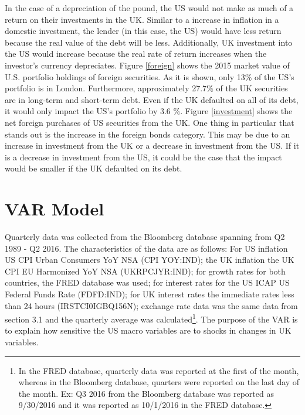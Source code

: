\documentclass[12pt]{article}
\begin{document}
In the case of a depreciation of the pound, the US would not make as much of a return on their investments in the UK. Similar to a increase in inflation in a domestic investment, the lender (in this case, the US) would have less return because the real value of the debt will be less. Additionally, UK investment into the US would increase because the real rate of return increases when the investor's currency depreciates.
Figure \ref{foreign} shows the 2015 market value of U.S. portfolio holdings of foreign securities. As it is shown, only 13$\%$ of the US's portfolio is in London. Furthermore, approximately 27.7$\%$ of the UK securities are in long-term and short-term debt. Even if the UK defaulted on all of its debt, it would only impact the US's portfolio by 3.6 $\%$. Figure \ref{investment} shows the net foreign purchases of US securities from the UK. One thing in particular that stands out is the increase in the foreign bonds category. This may be due to an increase in investment from the UK or a decrease in investment from the US. If it is a decrease in investment from the US, it could be the case that the impact would be smaller if the UK defaulted on its debt. 

\section{VAR Model}
Quarterly data was collected from the Bloomberg database spanning from Q2 1989 - Q2 2016. The characteristics of the data are as follows: For US inflation US CPI Urban Consumers YoY NSA (CPI YOY:IND); the UK inflation the UK CPI EU Harmonized YoY NSA (UKRPCJYR:IND); for growth rates for both countries, the FRED database was used; for interest rates for the US ICAP US Federal Funds Rate (FDFD:IND); for UK interest rates the immediate rates less than 24 hours (IRSTCI0IGBQ156N); exchange rate data was the same data from section 3.1 and the quarterly average was calculated\footnote{In the FRED database, quarterly data was reported at the first of the month, whereas in the Bloomberg database, quarters were reported on the last day of the month. Ex: Q3 2016 from the Bloomberg database was reported as 9/30/2016 and it was reported as 10/1/2016 in the FRED database.}. The purpose of the VAR is to explain how sensitive the US macro variables are to shocks in changes in UK variables. 
\end{document}
